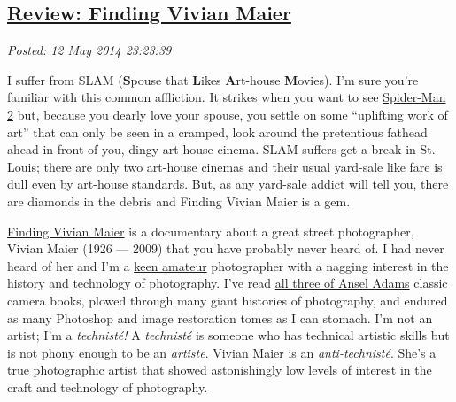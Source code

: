 %

\subsection*{\href{http://bakerjd99.wordpress.com/2014/05/12/review-finding-vivian-maier/}{Review: Finding Vivian Maier}}


\noindent\emph{Posted: 12 May 2014 23:23:39}
\vspace{6pt}

I suffer from SLAM (\textbf{S}pouse that \textbf{L}ikes
\textbf{A}rt-house \textbf{M}ovies). I'm sure you're familiar with this
common affliction. It strikes when you want to see
\href{http://www.rottentomatoes.com/m/spiderman\_2/}{Spider-Man 2} but,
because you dearly love your spouse, you settle on some ``uplifting work
of art'' that can only be seen in a cramped, look around the pretentious
fathead ahead in front of you, dingy art-house cinema. SLAM suffers get
a break in St. Louis; there are only two art-house cinemas and their
usual yard-sale like fare is dull even by art-house standards. But, as
any yard-sale addict will tell you, there are diamonds in the debris and
Finding Vivian Maier is a gem.


\href{http://www.findingvivianmaier.com/}{Finding Vivian Maier} is a
documentary about a great street photographer, Vivian Maier (1926
--- 2009) that you have probably never heard of. I had never heard of her
and I'm a \href{http://conceptcontrol.smugmug.com/}{keen amateur}
photographer with a nagging interest in the history and technology of
photography. I've read
\href{http://www.amazon.com/s/?ie=UTF8\&keywords=ansel+adams+the+camera\&tag=googhydr-20\&index=aps\&hvadid=28302426801\&hvpos=1t1\&hvexid=\&hvnetw=g\&hvrand=1899326277021743497\&hvpone=\&hvptwo=\&hvqmt=b\&hvdev=c\&ref=pd\_sl\_1mhliw1po6\_b}{all
three of Ansel Adams} classic camera books, plowed through many giant
histories of photography, and endured as many Photoshop and image
restoration tomes as I can stomach. I'm not an artist; I'm a
\emph{technisté!} A \emph{technisté} is someone who has technical
artistic skills but is not phony enough to be an \emph{artiste}. Vivian
Maier is an \emph{anti-technisté}. She's a true photographic artist that
showed astonishingly low levels of interest in the craft and technology
of photography.

